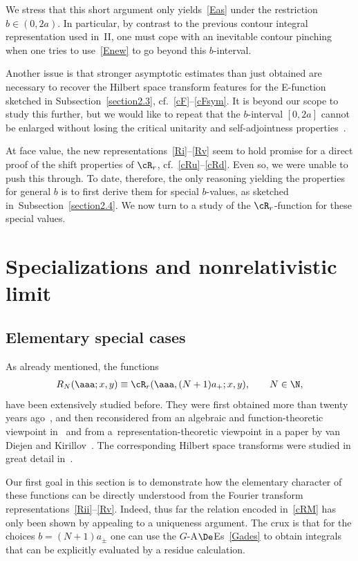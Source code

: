 \documentclass[pdftex]{sigma}
\numberwithin{equation}{section}
\begin{document}
We stress that this short argument only yields~\eqref{Eas} under the restriction $b\in(0,2a)$.  In particular, by contrast to the previous contour integral representation used in~II, one must cope with an inevitable contour pinching when one tries to use~\eqref{Enew} to go beyond this $b$-interval.

Another issue is that stronger asymptotic estimates than just obtained are necessary to recover the Hilbert space transform features for the E-function sketched in Subsection~\ref{section2.3}, cf.~\eqref{cF}--\eqref{cFsym}. It is beyond our scope to study this further, but we would like to repeat that the $b$-interval $[0,2a]$ cannot be enlarged without losing the critical unitarity and self-adjointness properties~\cite{Hilb}.

At face value, the new representations~\eqref{Ri}--\eqref{Rv} seem to hold promise for a direct proof of the shift properties of $\cR_r$, cf.~\eqref{cRu}--\eqref{cRd}. Even so, we were unable to push this through.  To date, therefore, the only reasoning yielding the properties for general $b$ is to f\/irst derive them for special $b$-values, as sketched in~Subsection~\ref{section2.4}. We now turn to a study of the $\cR_r$-function for these special values.

\section{Specializations and nonrelativistic limit}\label{section4}

\subsection{Elementary special cases}\label{section4.1}

As already mentioned, the functions
\begin{gather}\label{RN}
R_N(\aaa;x,y)\equiv \cR_r(\aaa,(N+1)a_+;x,y),\qquad N\in\N,
\end{gather}
have been extensively studied before. They were f\/irst obtained more than twenty years ago~\cite{fdss}, and then reconsidered from an  algebraic and function-theoretic viewpoint in~\cite{GLFII} and from a~representation-theoretic viewpoint in a paper by van Diejen and Kirillov~\cite{diki}. The corresponding Hilbert space transforms were studied in great detail in~\cite{Hilb}.

Our f\/irst goal in this section is to demonstrate how the elementary character of these functions can be directly understood from the Fourier transform representations~\eqref{Rii}--\eqref{Rv}. Indeed, thus far the relation encoded in~\eqref{cRM} has only been shown by appealing to a uniqueness argument. The crux is that for the choices $b=(N+1)a_{\pm}$  one can use the $G$-A$\De$Es~\eqref{Gades} to obtain integrals that can be explicitly evaluated by a residue calculation.
\end{document}

